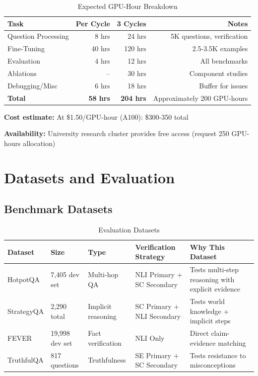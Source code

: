\documentclass[12pt,a4paper]{article}
\theoremstyle{definition}
\begin{document}
\begin{table}[htbp]
\centering
\caption{Expected GPU-Hour Breakdown}
\begin{tabular}{lrrr}
\toprule
\textbf{Task} & \textbf{Per Cycle} & \textbf{3 Cycles} & \textbf{Notes} \\
\midrule
Question Processing & 8 hrs & 24 hrs & 5K questions, verification \\
Fine-Tuning & 40 hrs & 120 hrs & 2.5-3.5K examples \\
Evaluation & 4 hrs & 12 hrs & All benchmarks \\
Ablations & -- & 30 hrs & Component studies \\
Debugging/Misc & 6 hrs & 18 hrs & Buffer for issues \\
\midrule
\textbf{Total} & \textbf{58 hrs} & \textbf{204 hrs} & Approximately 200 GPU-hours \\
\bottomrule
\end{tabular}
\end{table}

\textbf{Cost estimate:} At \$1.50/GPU-hour (A100): \$300-350 total

\textbf{Availability:} University research cluster provides free access (request 250 GPU-hours allocation)

\newpage

\section{Datasets and Evaluation}

\subsection{Benchmark Datasets}

\begin{table}[htbp]
\centering
\caption{Evaluation Datasets}
\small
\begin{tabular}{lp{2.5cm}p{2cm}p{2.5cm}p{2.5cm}}
\toprule
\textbf{Dataset} & \textbf{Size} & \textbf{Type} & \textbf{Verification Strategy} & \textbf{Why This Dataset} \\
\midrule
HotpotQA & 7,405 dev set & Multi-hop QA & NLI Primary + SC Secondary & Tests multi-step reasoning with explicit evidence \\
\midrule
StrategyQA & 2,290 total & Implicit reasoning & SC Primary + NLI Secondary & Tests world knowledge + implicit steps \\
\midrule
FEVER & 19,998 dev set & Fact verification & NLI Only & Direct claim-evidence matching \\
\midrule
TruthfulQA & 817 questions & Truthfulness & SE Primary + SC Secondary & Tests resistance to misconceptions \\
\bottomrule
\end{tabular}
\end{table}
\end{document}

